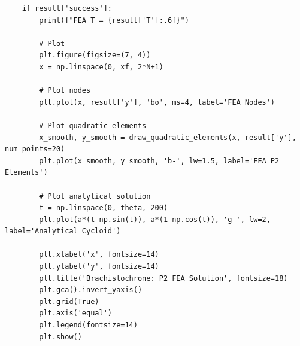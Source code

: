 \documentclass[11pt]{article}
\begin{document}
\begin{verbatim}
    if result['success']:
        print(f"FEA T = {result['T']:.6f}")

        # Plot
        plt.figure(figsize=(7, 4))
        x = np.linspace(0, xf, 2*N+1)

        # Plot nodes
        plt.plot(x, result['y'], 'bo', ms=4, label='FEA Nodes')

        # Plot quadratic elements
        x_smooth, y_smooth = draw_quadratic_elements(x, result['y'], num_points=20)
        plt.plot(x_smooth, y_smooth, 'b-', lw=1.5, label='FEA P2 Elements')

        # Plot analytical solution
        t = np.linspace(0, theta, 200)
        plt.plot(a*(t-np.sin(t)), a*(1-np.cos(t)), 'g-', lw=2, label='Analytical Cycloid')

        plt.xlabel('x', fontsize=14) 
        plt.ylabel('y', fontsize=14) 
        plt.title('Brachistochrone: P2 FEA Solution', fontsize=18)
        plt.gca().invert_yaxis()
        plt.grid(True)
        plt.axis('equal')
        plt.legend(fontsize=14)  
        plt.show()

\end{verbatim}
\end{document}
